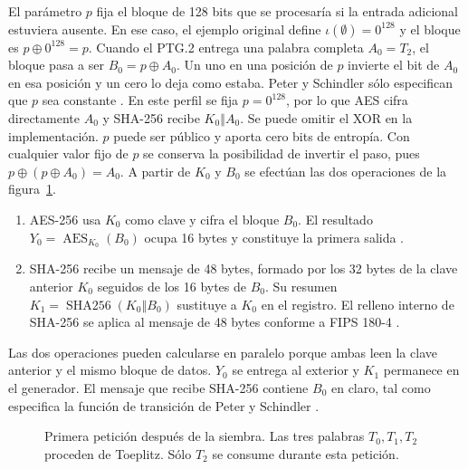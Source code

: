 \documentclass[11pt,a4paper]{article}
\newcommand{\Enc}{\operatorname{AES}}
\newcommand{\HH}{\operatorname{SHA256}}
\newcommand{\cat}{\mathbin\Vert}
\begin{document}
El parámetro \(p\) fija el bloque de 128 bits que se procesaría si la entrada adicional estuviera ausente. En ese caso, el ejemplo original define \(\iota(\emptyset)=0^{128}\) y el bloque es \(p\oplus 0^{128}=p\). Cuando el PTG.2 entrega una palabra completa \(A_0=T_2\), el bloque pasa a ser \(B_0=p\oplus A_0\). Un uno en una posición de \(p\) invierte el bit de \(A_0\) en esa posición y un cero lo deja como estaba. Peter y Schindler sólo especifican que \(p\) sea constante \cite[párr.~996, p.~203]{ais}. En este perfil se fija \(p=0^{128}\), por lo que AES cifra directamente \(A_0\) y SHA-256 recibe \(K_0\cat A_0\). Se puede omitir el XOR en la implementación. \(p\) puede ser público y aporta cero bits de entropía. Con cualquier valor fijo de \(p\) se conserva la posibilidad de invertir el paso, pues \(p\oplus(p\oplus A_0)=A_0\). A partir de \(K_0\) y \(B_0\) se efectúan las dos operaciones de la figura~\ref{fig:ais}.
\begin{enumerate}
\item AES-256 usa \(K_0\) como clave y cifra el bloque \(B_0\). El resultado \(Y_0=\Enc_{K_0}(B_0)\) ocupa 16 bytes y constituye la primera salida \cite[§5.1]{aes}.
\item SHA-256 recibe un mensaje de 48 bytes, formado por los 32 bytes de la clave anterior \(K_0\) seguidos de los 16 bytes de \(B_0\). Su resumen \(K_1=\HH(K_0\cat B_0)\) sustituye a \(K_0\) en el registro. El relleno interno de SHA-256 se aplica al mensaje de 48 bytes conforme a FIPS 180-4 \cite[§§5.1.1 y 6.2]{sha}.
\end{enumerate}
Las dos operaciones pueden calcularse en paralelo porque ambas leen la clave anterior y el mismo bloque de datos. \(Y_0\) se entrega al exterior y \(K_1\) permanece en el generador. El mensaje que recibe SHA-256 contiene \(B_0\) en claro, tal como especifica la función de transición de Peter y Schindler \cite[párr.~996, p.~203]{ais}.

\begin{figure}[htbp]\centering
{}
\caption{Primera petición después de la siembra. Las tres palabras \(T_0,T_1,T_2\) proceden de Toeplitz. Sólo \(T_2\) se consume durante esta petición.}\label{fig:ais}
\end{figure}
\end{document}
